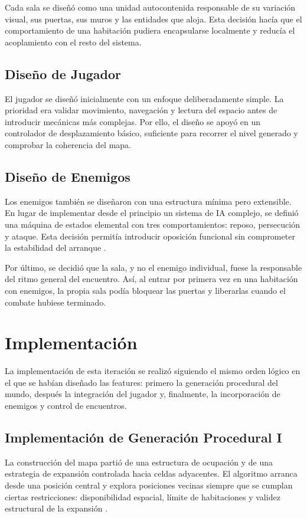 Cada sala se diseñó como una unidad autocontenida responsable de su variación visual, sus
puertas, sus muros y las entidades que aloja. Esta decisión hacía que el comportamiento de
una habitación pudiera encapsularse localmente y reducía el acoplamiento con el resto del
sistema.

\subsection{Diseño de Jugador}
El jugador se diseñó inicialmente con un enfoque deliberadamente simple. La prioridad era
validar movimiento, navegación y lectura del espacio antes de introducir mecánicas más
complejas. Por ello, el diseño se apoyó en un controlador de desplazamiento básico,
suficiente para recorrer el nivel generado y comprobar la coherencia del mapa.

\subsection{Diseño de Enemigos}
Los enemigos también se diseñaron con una estructura mínima pero extensible. En lugar de
implementar desde el principio un sistema de IA complejo, se definió una máquina de estados
elemental con tres comportamientos: reposo, persecución y ataque. Esta decisión permitía
introducir oposición funcional sin comprometer la estabilidad del arranque \cite{gamma1994designpatterns}.

Por último, se decidió que la sala, y no el enemigo individual, fuese la responsable del
ritmo general del encuentro. Así, al entrar por primera vez en una habitación con enemigos,
la propia sala podía bloquear las puertas y liberarlas cuando el combate hubiese terminado.

\section{Implementación}
La implementación de esta iteración se realizó siguiendo el mismo orden lógico en el que se
habían diseñado las features: primero la generación procedural del mundo, después la
integración del jugador y, finalmente, la incorporación de enemigos y control de encuentros.

\subsection{Implementación de Generación Procedural I}
La construcción del mapa partió de una estructura de ocupación y de una estrategia de
expansión controlada hacia celdas adyacentes. El algoritmo arranca desde una posición
central y explora posiciones vecinas siempre que se cumplan ciertas restricciones:
disponibilidad espacial, límite de habitaciones y validez estructural de la expansión
\cite{garnetBindingMap,luiscanaryProcgen}.

